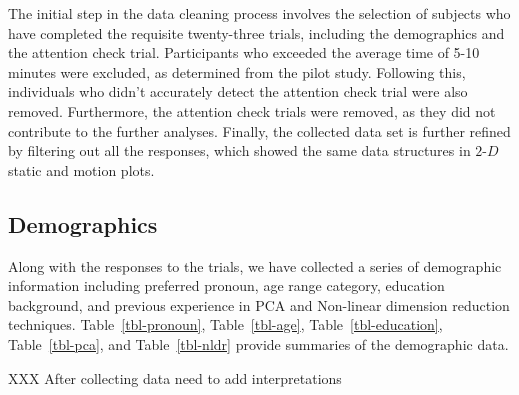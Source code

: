 \documentclass[
  11pt,
  a4paper,
]{report}
\newcommand\gD{$2\text{-}D$}
\begin{document}
The initial step in the data cleaning process involves the selection of
subjects who have completed the requisite twenty-three trials, including
the demographics and the attention check trial. Participants who
exceeded the average time of 5-10 minutes were excluded, as determined
from the pilot study. Following this, individuals who didn't accurately
detect the attention check trial were also removed. Furthermore, the
attention check trials were removed, as they did not contribute to the
further analyses. Finally, the collected data set is further refined by
filtering out all the responses, which showed the same data structures
in \gD{} static and motion plots.

\subsection{Demographics}\label{demographics}

Along with the responses to the trials, we have collected a series of
demographic information including preferred pronoun, age range category,
education background, and previous experience in PCA and Non-linear
dimension reduction techniques. Table~\ref{tbl-pronoun},
Table~\ref{tbl-age}, Table~\ref{tbl-education}, Table~\ref{tbl-pca}, and
Table~\ref{tbl-nldr} provide summaries of the demographic data.

XXX After collecting data need to add interpretations

\begin{table}

\caption{\label{tbl-pronoun}Summary of the pronoun distribution of
participants recruited for this study.}


\end{table}%
\end{document}
